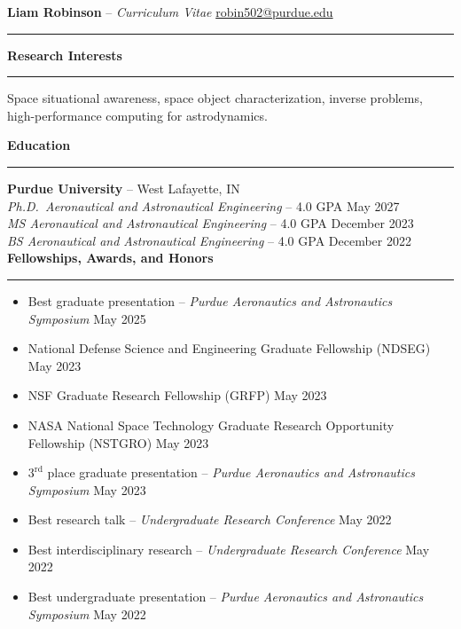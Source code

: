 \documentclass[10pt, a4paper]{article}
\newcommand{\sectiontitle}[1]{{\Large \textbf{#1}}\vspace{0.5em}\hrule\vspace{0.5em}}
\begin{document}
\thispagestyle{empty}



\noindent
\textbf{\huge Liam Robinson }{\huge -- }\textit{\huge Curriculum Vitae} \hfill \href{mailto:robin502@purdue.edu}{robin502@purdue.edu}
\rule{\linewidth}{4pt}
\vspace{-0.5em}

\sectiontitle{Research Interests}

Space situational awareness, space object characterization, inverse problems, high-performance computing for astrodynamics.

\sectiontitle{Education}
\textbf{Purdue University} -- West Lafayette, IN \\
\textit{Ph.D.\ Aeronautical and Astronautical Engineering} -- 4.0 GPA \hfill May 2027 \\
\textit{MS Aeronautical and Astronautical Engineering} -- 4.0 GPA \hfill December 2023 \\
\textit{BS Aeronautical and Astronautical Engineering} -- 4.0 GPA \hfill December 2022 \\

\sectiontitle{Fellowships, Awards, and Honors}
\begin{itemize}[noitemsep]
    \item Best graduate presentation -- \textit{Purdue Aeronautics and Astronautics Symposium} \hfill May 2025
    \item National Defense Science and Engineering Graduate Fellowship (NDSEG) \hfill May 2023
    \item NSF Graduate Research Fellowship (GRFP) \hfill May 2023
    \item NASA National Space Technology Graduate Research Opportunity Fellowship (NSTGRO) \hfill May 2023
    \item $3^\text{rd}$ place graduate presentation -- \textit{Purdue Aeronautics and Astronautics Symposium} \hfill May 2023
    \item Best research talk -- \textit{Undergraduate Research Conference} \hfill May 2022
    \item Best interdisciplinary research -- \textit{Undergraduate Research Conference} \hfill May 2022
    \item Best undergraduate presentation -- \textit{Purdue Aeronautics and Astronautics Symposium} \hfill May 2022
\end{itemize}
\end{document}
